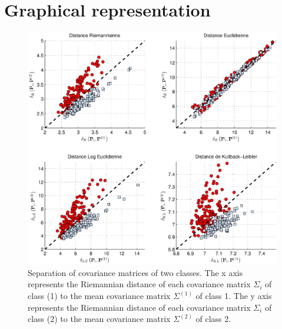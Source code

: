 \documentclass[a4paper,11pt]{report}
\begin{document}
\section{Graphical representation}

\begin{figure}[!h]
\begin{center}
  \includegraphics[width=.8\textwidth]{imgs/sep2.eps}
  \caption{\citep{BARACHANT2013172} Separation of covariance matrices of two classes. The x axis represents the Riemannian distance of each covariance matrix $\Sigma_i$ of class (1) to the mean covariance matrix $\Sigma^{(1)}$ of class 1. The y axis represents the Riemannian distance of each covariance matrix $\Sigma_i$ of class (2) to the mean covariance matrix $\Sigma^{(2)}$ of class 2.}
  \end{center}
\end{figure}
\end{document}
